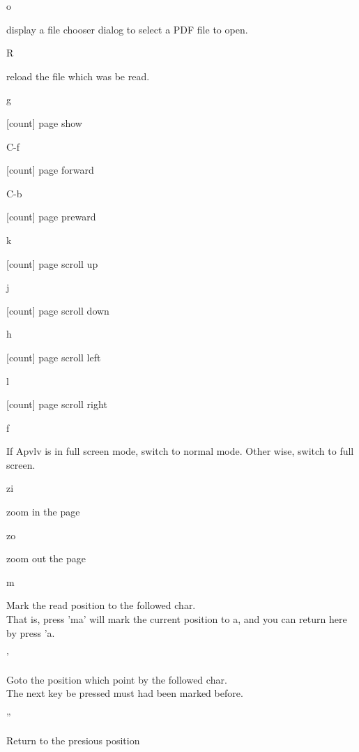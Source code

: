 \documentclass[a4paper,12pt]{article}
\begin{document}
\begin{description}

\item o

display a file chooser dialog to select a PDF file to open.

\item R

reload the file which was be read.

\item g

[count] page show

\item C-f

[count] page forward

\item C-b

[count] page preward

\item k

[count] page scroll up

\item j

[count] page scroll down

\item h

[count] page scroll left

\item l

[count] page scroll right

\item f

If Apvlv is in full screen mode, switch to normal mode. Other wise, switch to full screen.

\item zi

zoom in the page

\item zo

zoom out the page

\item m

Mark the read position to the followed char. \\
That is, press 'ma' will mark the current position to a, and you can return here by press 'a.

\item '

Goto the position which point by the followed char. \\
The next key be pressed must had been marked before. 

\item ''

Return to the presious position

\end{description}
\end{document}
